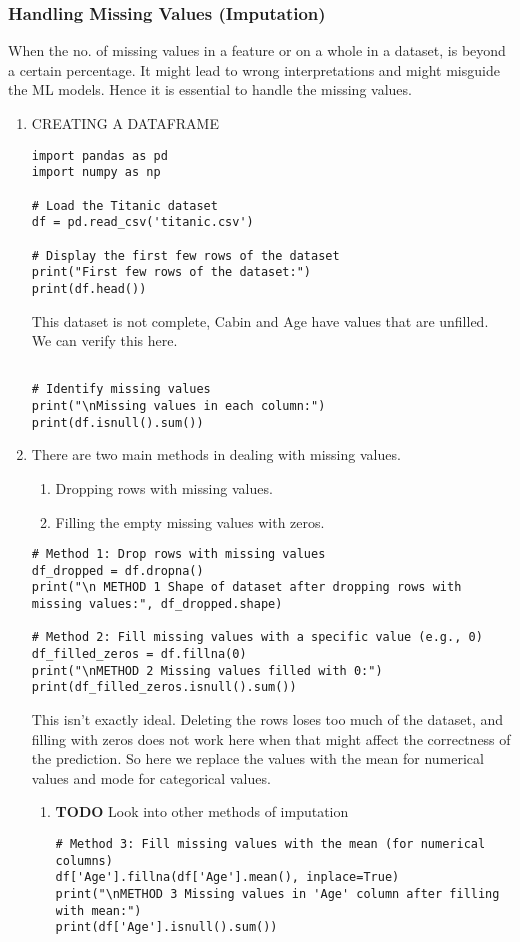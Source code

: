 \documentclass[11pt]{article}
\begin{document}
\subsubsection{Handling Missing Values (Imputation)}
\label{sec:org0667dd8}
When the no. of missing values in a feature or on a whole in a dataset, is beyond a certain percentage. It might lead to wrong interpretations and might misguide the ML models.
Hence it is essential to handle the missing values.
\begin{enumerate}
\item CREATING A DATAFRAME
\label{sec:orgdf6c87a}
\begin{verbatim}
import pandas as pd
import numpy as np

# Load the Titanic dataset
df = pd.read_csv('titanic.csv')

# Display the first few rows of the dataset
print("First few rows of the dataset:")
print(df.head())
\end{verbatim}

This dataset is not complete, Cabin and Age have values that are unfilled. We can verify this here.
\begin{verbatim}

# Identify missing values
print("\nMissing values in each column:")
print(df.isnull().sum())

\end{verbatim}
\item There are two main methods in dealing with missing values.
\label{sec:orge056c94}
\begin{enumerate}
\item Dropping rows with missing values.
\item Filling the empty missing values with zeros.
\end{enumerate}
\begin{verbatim}
# Method 1: Drop rows with missing values
df_dropped = df.dropna()
print("\n METHOD 1 Shape of dataset after dropping rows with missing values:", df_dropped.shape)

# Method 2: Fill missing values with a specific value (e.g., 0)
df_filled_zeros = df.fillna(0)
print("\nMETHOD 2 Missing values filled with 0:")
print(df_filled_zeros.isnull().sum())

\end{verbatim}

This isn't exactly ideal. Deleting the rows loses too  much of the dataset, and filling with zeros does not work here when that might affect the correctness of the prediction.
So here we replace the values with the mean for numerical values and mode for categorical values.
\begin{enumerate}
\item {\bfseries\sffamily TODO} Look into other methods of imputation
\label{sec:org5f6e55c}
\begin{verbatim}
# Method 3: Fill missing values with the mean (for numerical columns)
df['Age'].fillna(df['Age'].mean(), inplace=True)
print("\nMETHOD 3 Missing values in 'Age' column after filling with mean:")
print(df['Age'].isnull().sum())


\end{verbatim}
\end{enumerate}
\end{enumerate}
\end{document}
